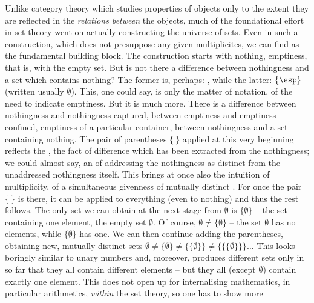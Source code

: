 Unlike category theory which studies properties of objects only to the extent
they are reflected in the {\em relations between} the objects, much of the
foundational effort in set theory went on actually constructing the universe of
sets. Even in such a construction, which does not presuppose any given
multiplicites, we can find  as the fundamental building
block. The construction starts with nothing, emptiness, that is, with the empty
set.  But is not there a difference between nothingness and a set which contains
nothing? The former is, perhaps: \esp, while the latter: $\{\esp\}$ (written
usually $\emptyset$). This, one could say, is only the matter of notation, of
the need to indicate emptiness. But it is much more.  There is a difference
between nothingness and nothingness captured, between emptiness and emptiness
confined, emptiness of a particular container, between nothingness and a set
containing nothing. The pair of parentheses $\{\ \}$ applied at this very
beginning reflects the , the fact of difference which has
been extracted from the nothingness; we could almost say, an  of
 addressing the nothingness as distinct from the unaddressed
nothingness itself. This  brings at once also the intuition of
multiplicity, of a simultaneous givenness of mutually distinct .  For once the pair $\{\ \}$ is there, it can be applied to
everything (even to nothing) and thus the rest follows.  The only set we can
obtain at the next stage from $\emptyset$ is $\{\emptyset\}$ -- the set
containing one element, the empty set $\emptyset$.  Of course, $\emptyset
\not=\{\emptyset\}$ -- the set $\emptyset$ has no elements, while
$\{\emptyset\}$ has one.  We can then continue adding the parentheses, obtaining
new, mutually distinct sets $\emptyset \not= \{\emptyset\} \not=
\{\{\emptyset\}\} \not= \{\{\{\emptyset\}\}\}\ldots$ This looks boringly similar
to unary numbers and, moreover, produces different sets only in so far that they
all contain different elements -- but they all (except $\emptyset$) contain
exactly one element.  This does not open up for internalising mathematics, in
particular arithmetics, {\em within} the set theory, so one has to show more
